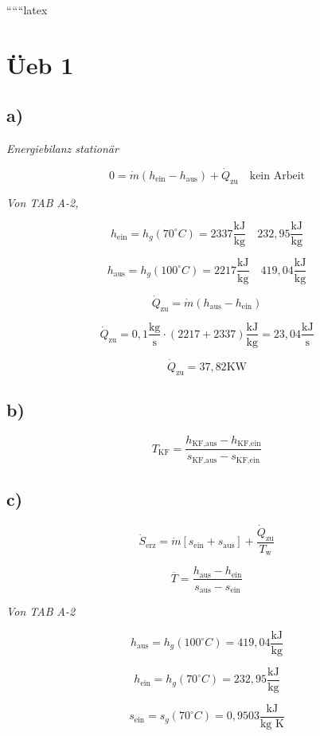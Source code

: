 
``````latex


\section*{Üeb 1}

\subsection*{a)}
\textit{Energiebilanz stationär}

\[
0 = \dot{m} (h_{\text{ein}} - h_{\text{aus}}) + \dot{Q}_{\text{zu}} \quad \text{kein Arbeit}
\]

\textit{Von TAB A-2,}

\[
h_{\text{ein}} = h_g(70^\circ C) = 2337 \frac{\text{kJ}}{\text{kg}} \quad 232,95 \frac{\text{kJ}}{\text{kg}}
\]

\[
h_{\text{aus}} = h_g(100^\circ C) = 2217 \frac{\text{kJ}}{\text{kg}} \quad 419,04 \frac{\text{kJ}}{\text{kg}}
\]

\[
\dot{Q}_{\text{zu}} = \dot{m} (h_{\text{aus}} - h_{\text{ein}})
\]

\[
\dot{Q}_{\text{zu}} = 0,1 \frac{\text{kg}}{\text{s}} \cdot (2217 + 2337) \frac{\text{kJ}}{\text{kg}} = 23,04 \frac{\text{kJ}}{\text{s}}
\]

\[
\dot{Q}_{\text{zu}} = 37,82 \text{KW}
\]

\subsection*{b)}

\[
T_{\text{KF}} = \frac{h_{\text{KF,aus}} - h_{\text{KF,ein}}}{s_{\text{KF,aus}} - s_{\text{KF,ein}}}
\]

\subsection*{c)}

\[
\dot{S}_{\text{erz}} = \dot{m} [s_{\text{ein}} + s_{\text{aus}}] + \frac{\dot{Q}_{\text{zu}}}{T_{\text{w}}}
\]

\[
\overline{T} = \frac{h_{\text{aus}} - h_{\text{ein}}}{s_{\text{aus}} - s_{\text{ein}}}
\]

\textit{Von TAB A-2}

\[
h_{\text{aus}} = h_g(100^\circ C) = 419,04 \frac{\text{kJ}}{\text{kg}}
\]

\[
h_{\text{ein}} = h_g(70^\circ C) = 232,95 \frac{\text{kJ}}{\text{kg}}
\]

\[
s_{\text{ein}} = s_g(70^\circ C) = 0,9503 \frac{\text{kJ}}{\text{kg K}}
\]

